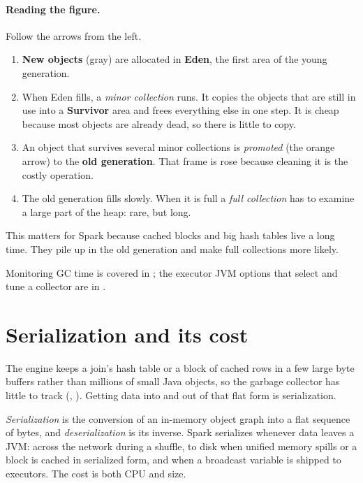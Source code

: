 \paragraph{Reading the figure.} Follow the arrows from the left.
\begin{enumerate}[nosep]
\item \textbf{New objects} (gray) are allocated in \textbf{Eden}, the first
      area of the young generation.
\item When Eden fills, a \emph{minor collection} runs. It copies the objects that
      are still in use into a \textbf{Survivor} area and frees everything else in one
      step. It is cheap because most objects are already dead, so there is little to
      copy.
\item An object that survives several minor collections is \emph{promoted} (the
      orange arrow) to the \textbf{old generation}. That frame is rose because
      cleaning it is the costly operation.
\item The old generation fills slowly. When it is full a \emph{full collection}
      has to examine a large part of the heap: rare, but long.
\end{enumerate}
This matters for Spark because cached blocks and big hash tables live a long time.
They pile up in the old generation and make full collections more likely.


Monitoring GC time is covered in ; the executor JVM
options that select and tune a collector are in .

\section{Serialization and its cost}
\label{sec:mem-serialization}

The engine keeps a join's hash table or a block of cached rows in a few large
byte buffers rather than millions of small Java objects, so the garbage collector
has little to track (, ). Getting
data into and out of that flat form is serialization.

\emph{Serialization} is the conversion of an in-memory object graph into a flat
sequence of bytes, and \emph{deserialization} is its inverse. Spark serializes
whenever data leaves a JVM: across the network during a shuffle, to disk when
unified memory spills or a block is cached in serialized form, and when a
broadcast variable is shipped to executors. The cost is both CPU and size.


